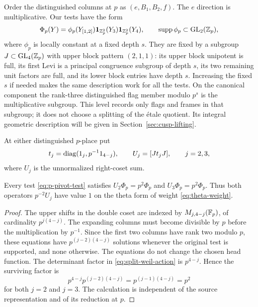 Order the distinguished columns at $p$ as $(e,B_1,B_2,f)$.  The $e$
direction is multiplicative.  Our tests have the form
\begin{equation}\label{eq:p-pivot-test}
 \Phi_p(Y)=\phi_p(Y_{[1,2]})
           \mathbf 1_{\mathbb Z_p^2}(Y_3)\mathbf 1_{\mathbb Z_p^2}(Y_4),
 \qquad \operatorname{supp}\phi_p\subset\operatorname{GL}_2(\mathbb Z_p),
\end{equation}
where $\phi_p$ is locally constant at a fixed depth $s$.
They are fixed by a subgroup $J\subset\operatorname{GL}_4(\mathbb Z_p)$ with upper block
pattern $(2,1,1)$: its upper block unipotent is full, its first Levi is a
principal congruence subgroup of depth $s$, its two remaining unit factors
are full, and its lower block entries have depth $s$.  Increasing the
fixed $s$ if needed makes the same description work for all the tests.
On the canonical component the rank-three distinguished flag member
modulo $p^s$ is the multiplicative subgroup.  This level records only
flags and frames in that subgroup; it does not choose a splitting of the
\'etale quotient.  Its integral geometric description will be given in
Section~\ref{sec:cusp-lifting}.

At either distinguished $p$-place put
\begin{equation}\label{eq:theta-u-operators}
 t_j=\operatorname{diag}(1_j,p^{-1}1_{4-j}),\qquad U_j=[Jt_jJ],\qquad j=2,3,
\end{equation}
where $U_j$ is the unnormalized right-coset sum.

\begin{lemma}\label{lem:split-u-operators}
 Every test \eqref{eq:p-pivot-test} satisfies $U_2\Phi_p=p^2\Phi_p$
and $U_3\Phi_p=p^2\Phi_p$.  Thus both operators $p^{-2}U_j$ have
value $1$ on the theta form of weight \eqref{eq:theta-weight}.
\end{lemma}
\begin{proof}
 The upper shifts in the double coset are indexed by
 $M_{j,4-j}(\mathbb F_p)$, of cardinality $p^{j(4-j)}$.  The expanding columns
 must become divisible by $p$ before the multiplication by $p^{-1}$.
 Since the first two columns have rank two modulo $p$, these equations
 have $p^{(j-2)(4-j)}$ solutions whenever the original test is supported,
 and none otherwise.  The equations do not change the chosen head
 function.  The determinant factor in \eqref{eq:split-weil-action} is
 $p^{4-j}$.  Hence the surviving factor is
 \[
 p^{4-j}p^{(j-2)(4-j)}=p^{(j-1)(4-j)}=p^2
 \]
 for both $j=2$ and $j=3$.  The calculation is independent of the source
 representation and of its reduction at $p$.
\end{proof}

